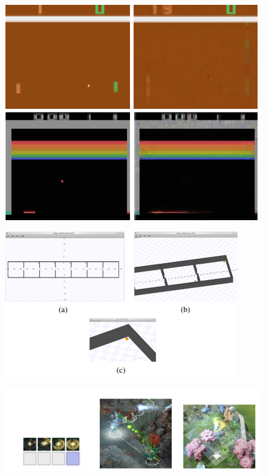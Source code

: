 \documentclass[12pt, a4paper]{article}
\begin{document}
\begin{landscape}
	\begin{figure}[!ht]		
		\caption[]{}
		\centering
		
		\includegraphics[height= 5 cm]{atarioyun.png}
		\label{}	
		
		\caption[]{}
		\centering
		
		\includegraphics[height= 5 cm]{robotoyun.png}
		\label{}	
		\caption[]{}
		\centering
				
		\includegraphics[height= 5 cm]{dota2.png}
		\label{}	
		
		

	\end{figure}
\end{landscape}	



	
\end{document}
